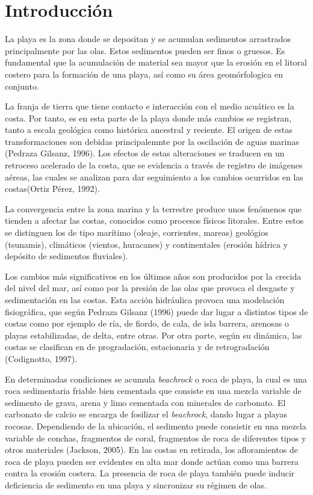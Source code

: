 \documentclass[11pt,]{article}
\begin{document}
\vskip 6.5pt


\noindent  \section{Introducción}\label{introducciuxf3n}

La playa es la zona donde se depositan y se acumulan sedimentos
arrastrados principalmente por las olas. Estos sedimentos pueden ser
finos o gruesos. Es fundamental que la acumulación de material sea mayor
que la erosión en el litoral costero para la formación de una playa, así
como su área geomórfologica en conjunto.

La franja de tierra que tiene contacto e interacción con el medio
acuático es la costa. Por tanto, es en esta parte de la playa donde más
cambios se registran, tanto a escala geológica como histórica ancestral
y reciente. El origen de estas transformaciones son debidas
principalemnte por la oscilación de aguas marinas (Pedraza Gilsanz,
1996). Los efectos de estas alteraciones se traducen en un retroceso
acelerado de la costa, que se evidencia a través de registro de imágenes
aéreas, las cuales se analizan para dar seguimiento a los cambios
ocurridos en las costas(Ortiz Pérez, 1992).

La convergencia entre la zona marina y la terrestre produce unos
fenómenos que tienden a afectar las costas, conocidos como procesos
físicos litorales. Entre estos se distinguen los de tipo marítimo
(oleaje, corrientes, mareas) geológios (tsunamis), climáticos (vientos,
huracanes) y continentales (erosión hídrica y depósito de sedimentos
fluviales).

Los cambios más significativos en los últimos años son producidos por la
crecida del nivel del mar, así como por la presión de las olas que
provoca el desgaste y sedimentación en las costas. Esta acción
hidráulica provoca una modelación fisiográfica, que según Pedraza
Gilsanz (1996) puede dar lugar a distintos tipos de costas como por
ejemplo de ría, de fiordo, de cala, de isla barrera, arenosas o playas
estabilizadas, de delta, entre otras. Por otra parte, según su dinámica,
las costas se clasifican en de progradación, estacionaria y de
retrogradación (Codignotto, 1997).

En determinadas condiciones se acumula \emph{beachrock} o roca de playa,
la cual es una roca sedimentaria friable bien cementada que consiste en
una mezcla variable de sedimento de grava, arena y limo cementada con
minerales de carbonato. El carbonato de calcio se encarga de fosilizar
el \emph{beachrock}, dando lugar a playas rocosas. Dependiendo de la
ubicación, el sedimento puede consistir en una mezcla variable de
conchas, fragmentos de coral, fragmentos de roca de diferentes tipos y
otros materiales (Jackson, 2005). En las costas en retirada, los
afloramientos de roca de playa pueden ser evidentes en alta mar donde
actúan como una barrera contra la erosión costera. La presencia de roca
de playa también puede inducir deficiencia de sedimento en una playa y
sincronizar su régimen de olas.
\end{document}
